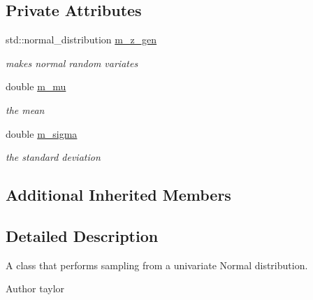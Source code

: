 \subsection*{Private Attributes}
\begin{DoxyCompactItemize}
\item 
std\+::normal\+\_\+distribution \hyperlink{classrvsamp_1_1UnivNormSampler_a8a09d00be22388d11bcd71c3cce630b1}{m\+\_\+z\+\_\+gen}\hypertarget{classrvsamp_1_1UnivNormSampler_a8a09d00be22388d11bcd71c3cce630b1}{}\label{classrvsamp_1_1UnivNormSampler_a8a09d00be22388d11bcd71c3cce630b1}

\begin{DoxyCompactList}\small\item\em makes normal random variates \end{DoxyCompactList}\item 
double \hyperlink{classrvsamp_1_1UnivNormSampler_a56943494b7a0c98a7252e438540ee851}{m\+\_\+mu}\hypertarget{classrvsamp_1_1UnivNormSampler_a56943494b7a0c98a7252e438540ee851}{}\label{classrvsamp_1_1UnivNormSampler_a56943494b7a0c98a7252e438540ee851}

\begin{DoxyCompactList}\small\item\em the mean \end{DoxyCompactList}\item 
double \hyperlink{classrvsamp_1_1UnivNormSampler_a445bb88404c77f33229fe9a029e8a4a5}{m\+\_\+sigma}\hypertarget{classrvsamp_1_1UnivNormSampler_a445bb88404c77f33229fe9a029e8a4a5}{}\label{classrvsamp_1_1UnivNormSampler_a445bb88404c77f33229fe9a029e8a4a5}

\begin{DoxyCompactList}\small\item\em the standard deviation \end{DoxyCompactList}\end{DoxyCompactItemize}
\subsection*{Additional Inherited Members}


\subsection{Detailed Description}
A class that performs sampling from a univariate Normal distribution. 

\begin{DoxyAuthor}{Author}
taylor 
\end{DoxyAuthor}


